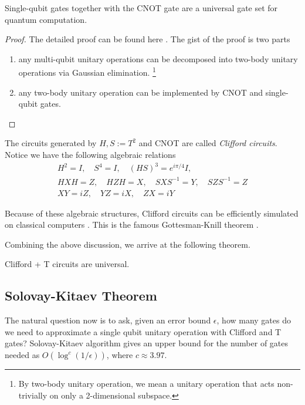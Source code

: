 \begin{theorem}
	Single-qubit gates together with the CNOT gate are a universal gate set for quantum computation.
\end{theorem}

\begin{proof}
	The detailed proof can be found here \cite{barenco1995elementary}.
	The gist of the proof is two parts 
	\begin{enumerate}
		\item any multi-qubit unitary operations can be decomposed into two-body unitary operations via Gaussian elimination. \footnote{By two-body unitary operation, we mean a unitary operation that acts non-trivially on only a 2-dimensional subspace.} 
		\item any two-body unitary operation can be implemented by CNOT and single-qubit gates.
	\end{enumerate}
\end{proof}

The circuits generated by $H, S:=T^2$ and CNOT are called \emph{Clifford circuits}.
Notice we have the following algebraic relations 
\begin{equation*}
	\begin{aligned}
		H^2 = I, \quad S^4 = I, \quad (HS)^3 = e^{i\pi/4} I, \\
		H X H = Z, \quad H Z H = X, \quad S X S^{-1} = Y, \quad S Z S^{-1} = Z\\ 
		 XY = i Z, \quad YZ = i X, \quad ZX = i Y
	\end{aligned}
\end{equation*}

Because of these algebraic structures, Clifford circuits can be efficiently simulated on classical computers \cite{nest2009classicalsimulationquantumcomputation}.
This is the famous Gottesman-Knill theorem \cite{gottesman1998heisenbergrepresentationquantumcomputers}.

Combining the above discussion, we arrive at the following theorem. 

\begin{theorem}
	Clifford + T circuits are universal. 
\end{theorem}

\subsection{Solovay-Kitaev Theorem}

The natural question now is to ask, given an error bound $\epsilon$, how many gates do we need to approximate a single qubit unitary operation with Clifford and T gates?
Solovay-Kitaev algorithm \cite{dawson2005solovaykitaevalgorithm} gives an upper bound for the number of gates needed as $O(\log^c(1/\epsilon))$, where $c \approx 3.97$.

